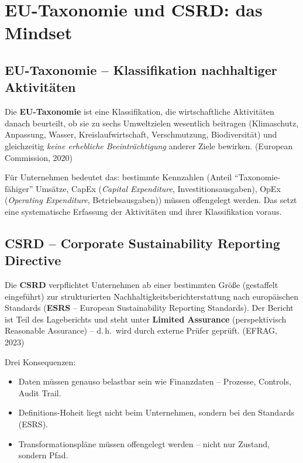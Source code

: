 \documentclass[11pt,a4paper,oneside]{article}
\newcommand{\fachbegriff}[1]{\textbf{#1}}
\newcommand{\quelle}[1]{{\footnotesize\color{lpGray}(#1)}}
\begin{document}
\section{EU-Taxonomie und CSRD: das Mindset}

\subsection{EU-Taxonomie -- Klassifikation nachhaltiger Aktivitäten}

Die \fachbegriff{EU-Taxonomie} ist eine Klassifikation, die wirtschaftliche Aktivitäten danach beurteilt, ob sie zu sechs Umweltzielen wesentlich beitragen (Klimaschutz, Anpassung, Wasser, Kreislaufwirtschaft, Verschmutzung, Biodiversität) und gleichzeitig \emph{keine erhebliche Beeinträchtigung} anderer Ziele bewirken. \quelle{European Commission, 2020}

Für Unternehmen bedeutet das: bestimmte Kennzahlen (Anteil ``Taxonomie-fähiger'' Umsätze, CapEx (\emph{Capital Expenditure}, Investitionsausgaben), OpEx (\emph{Operating Expenditure}, Betriebsausgaben)) müssen offengelegt werden. Das setzt eine systematische Erfassung der Aktivitäten und ihrer Klassifikation voraus.

\subsection{CSRD -- Corporate Sustainability Reporting Directive}

Die \fachbegriff{CSRD} verpflichtet Unternehmen ab einer bestimmten Größe (gestaffelt eingeführt) zur strukturierten Nachhaltigkeitsberichterstattung nach europäischen Standards (\fachbegriff{ESRS} -- European Sustainability Reporting Standards). Der Bericht ist Teil des Lageberichts und steht unter \fachbegriff{Limited Assurance} (perspektivisch Reasonable Assurance) -- d.\,h.\ wird durch externe Prüfer geprüft. \quelle{EFRAG, 2023}

Drei Konsequenzen:

\begin{itemize}
  \item Daten müssen genauso belastbar sein wie Finanzdaten -- Prozesse, Controls, Audit Trail.
  \item Definitions-Hoheit liegt nicht beim Unternehmen, sondern bei den Standards (ESRS).
  \item Transformationspläne müssen offengelegt werden -- nicht nur Zustand, sondern Pfad.
\end{itemize}
\end{document}
